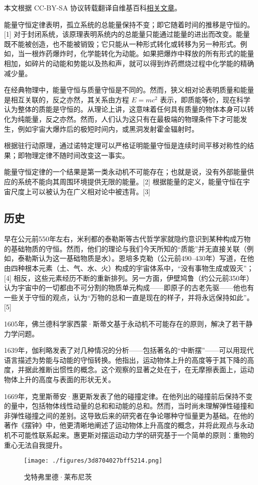 
本文根据 CC-BY-SA 协议转载翻译自维基百科\href{https://en.wikipedia.org/wiki/Conservation_of_energy}{相关文章}。

能量守恒定律表明，孤立系统的总能量保持不变；即它随着时间的推移是守恒的。[1] 对于封闭系统，该原理表明系统内的总能量只能通过能量的进出而改变。能量既不能被创造，也不能被销毁；它只能从一种形式转化或转移为另一种形式。例如，当一根炸药爆炸时，化学能转化为动能。如果把爆炸中释放的所有形式的能量相加，如碎片的动能和势能以及热和声，就可以得到炸药燃烧过程中化学能的精确减少量。

在经典物理中，能量守恒与质量守恒是不同的。然而，狭义相对论表明质量和能量是相互关联的，反之亦然，其关系由方程 \( E = mc^2 \) 表示，即质能等价，现在科学认为整体的质能是守恒的。从理论上讲，这意味着任何具有质量的物体本身可以转化为纯能量，反之亦然。然而，人们认为这只有在最极端的物理条件下才可能发生，例如宇宙大爆炸后的极短时间内，或黑洞发射霍金辐射时。

根据驻行动原理，通过诺特定理可以严格证明能量守恒是连续时间平移对称性的结果；即物理定律不随时间改变这一事实。

能量守恒定律的一个结果是第一类永动机不可能存在；也就是说，没有外部能量供应的系统不能向其周围环境提供无限的能量。[2] 根据能量的定义，能量守恒在宇宙尺度上可以被认为在广义相对论中被违背。[3]
\subsection{历史}
早在公元前550年左右，米利都的泰勒斯等古代哲学家就隐约意识到某种构成万物的基础物质的守恒。然而，他们的理论与我们今天所知的“质能”并无直接关联（例如，泰勒斯认为这一基础物质是水）。恩培多克勒（公元前490–430年）写道，在他由四种根本元素（土、气、水、火）构成的宇宙体系中，“没有事物生成或毁灭”；[4] 相反，这些元素经历不断的重新排列。另一方面，伊壁鸠鲁（约公元前350年）认为宇宙中的一切都由不可分割的物质单元构成——即原子的古老先驱——他也有一些关于守恒的观点，认为“万物的总和一直是现在的样子，并将永远保持如此”。[5]

1605年，佛兰德科学家西蒙·斯蒂文基于永动机不可能存在的原则，解决了若干静力学问题。

1639年，伽利略发表了对几种情况的分析——包括著名的“中断摆”——可以用现代语言描述为势能与动能的守恒转换。他指出，运动物体上升的高度等于其下降的高度，并据此推断出惯性的概念。这个观察的显著之处在于，在无摩擦表面上，运动物体上升的高度与表面的形状无关。

1669年，克里斯蒂安·惠更斯发表了他的碰撞定律。在他列出的碰撞前后保持不变的量中，包括物体线性动量的总和和动能的总和。然而，当时尚未理解弹性碰撞和非弹性碰撞之间的差别。这导致后来的研究者在争论哪种守恒量更为基础。在他的著作《摆钟》中，他更清晰地阐述了运动物体上升高度的概念，并将此观点与永动机不可能性联系起来。惠更斯对摆运动动力学的研究基于一个简单的原则：重物的重心无法自我提升。
\begin{figure}[ht]
\centering
\texttt{[image: ./figures/3d8704027bff5214.png]}
\caption{戈特弗里德·莱布尼茨} \label{fig_NLSH_1}
\end{figure}